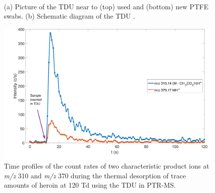 
\begin{figure}%
  \\
  \caption{(a) Picture of the TDU near to (top) used and (bottom) new PTFE swabs. (b) Schematic diagram of the TDU \cite{RN445}.}\label{fig:tdu}
\end{figure}

\begin{figure}%
  \includegraphics[width=0.7\linewidth]{pics/heroin_desorption.png}
  \caption{Time profiles of the count rates of two characteristic product ions at \textit{m/z} 310 and \textit{m/z} 370 during the thermal desorption of trace amounts of heroin at 120 Td using the TDU in PTR-MS.}\label{fig:tdu_heroin}
\end{figure}



